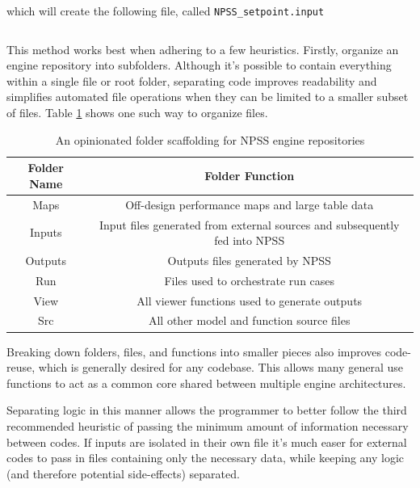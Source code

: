 \documentclass[heading.tex]{subfiles}
\begin{document}
 \begin{adjustwidth}{-1cm}{-1cm}
 \inputminted[]{matlab}{code/dlmwrite.m}
 \end{adjustwidth} 

which will create the following file, called \texttt{NPSS\_setpoint.input}

 \begin{adjustwidth}{-1cm}{-1cm}
 \inputminted[]{matlab}{code/dlmOutput.m}
 \end{adjustwidth} 


This method works best when adhering to a few heuristics. Firstly, organize an engine repository
into subfolders. Although it's possible to contain everything within a single file or root folder, separating code
improves readability and simplifies automated file operations when they can be limited to a smaller subset of files.
Table \ref{tab:Scaffolding} shows one such way to organize files.

\begin{table}[H]
\centering
\begin{tabular}{|c|c|}
\hline 
Folder Name & Folder Function \\ 
\hline \hline
Maps & Off-design performance maps and large table data \\ 
\hline 
Inputs & Input files generated from external sources and subsequently fed into NPSS \\ 
\hline 
Outputs & Outputs files generated by NPSS \\ 
\hline 
Run & Files used to orchestrate run cases \\ 
\hline 
View & All viewer functions used to generate outputs \\ 
\hline 
Src & All other model and function source files \\ 
\hline 
\end{tabular} 
\caption{An opinionated folder scaffolding for NPSS engine repositories}
\label{tab:Scaffolding}
\end{table}

Breaking down folders, files, and functions into smaller pieces also improves code-reuse,
which is generally desired for any codebase.
This allows many general use functions to act as a common core shared between multiple engine architectures.

Separating logic in this manner allows the programmer to better follow the third recommended heuristic
of passing the minimum amount of information necessary between codes. If inputs are isolated in their own file
it's much easer for external codes to pass in files containing only the necessary data, 
while keeping any logic (and therefore potential side-effects) separated.
\end{document}
